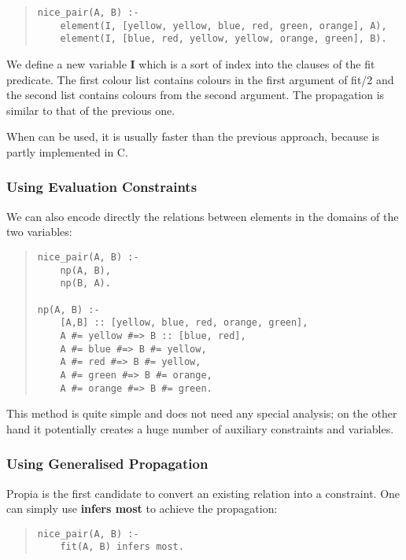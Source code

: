 \begin{quote}
\begin{verbatim}
nice_pair(A, B) :-
    element(I, [yellow, yellow, blue, red, green, orange], A),
    element(I, [blue, red, yellow, yellow, orange, green], B).
\end{verbatim}
\end{quote}

We define a new variable {\bf I} which is a sort of index into the
clauses of the fit predicate. The first colour list contains
colours in the first argument of fit/2 and the second list
contains colours from the second argument. The propagation is similar
to that of the previous one.

When  can be used, it is usually faster
than the previous approach, because  is partly
implemented in C.

\subsubsection{Using Evaluation Constraints}
We can also encode directly the relations between elements
in the domains of the two variables:

\begin{quote}
\begin{verbatim}
nice_pair(A, B) :-
    np(A, B),
    np(B, A).

np(A, B) :-
    [A,B] :: [yellow, blue, red, orange, green],
    A #= yellow #=> B :: [blue, red],
    A #= blue #=> B #= yellow,
    A #= red #=> B #= yellow,
    A #= green #=> B #= orange,
    A #= orange #=> B #= green.
\end{verbatim}
\end{quote}

This method is quite simple and does not need any special analysis;
on the other hand it potentially creates a huge number of
auxiliary constraints and variables.


\subsubsection{Using Generalised Propagation}
Propia is the first candidate to convert an existing relation into
a constraint. One can simply use {\bf infers most} to achieve the propagation:

\begin{quote}
\begin{verbatim}
nice_pair(A, B) :-
    fit(A, B) infers most.
\end{verbatim}
\end{quote}

